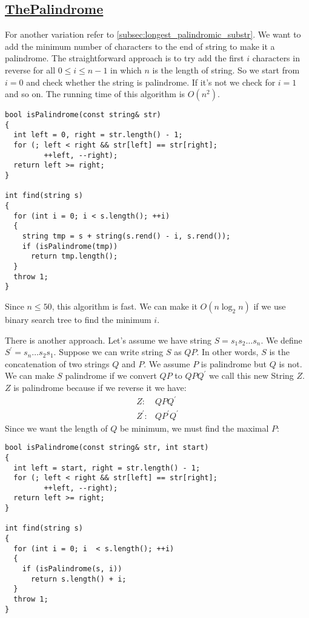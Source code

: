 \documentclass{book}
\begin{document}
	\subsection{\href{https://community.topcoder.com/stat?c=problem_statement&pm=10182&rd=13519}{ThePalindrome}}
	\label{subsec:the_palindrome}
	For another variation refer to \ref{subsec:longest_palindromic_substr}.
	We want to add the minimum number of characters to the end of string to make it a palindrome. The straightforward approach is to try add the first $i$ characters in reverse for all $0 \le i \le n - 1$ in which $n$ is the length of string. So we start from $i = 0$ and check whether the string is palindrome. If it's not we check for $i = 1$ and so on. The running time of this algorithm is $O(n^2)$.
	
	\begin{lstlisting}
bool isPalindrome(const string& str)
{
  int left = 0, right = str.length() - 1;
  for (; left < right && str[left] == str[right]; 
         ++left, --right);
  return left >= right;
}

int find(string s)
{
  for (int i = 0; i < s.length(); ++i)
  {
    string tmp = s + string(s.rend() - i, s.rend());
    if (isPalindrome(tmp))
      return tmp.length();
  }
  throw 1;
}
	\end{lstlisting}
	Since $n \le 50$, this algorithm is fast. We can make it $O(n\log_2{n})$ if we use binary search tree to find the minimum $i$.
	\par There is another approach. Let's assume we have string $S = s_1 s_2 \dots s_n$. We define $S^\prime = s_n \dots s_2 s_1$. Suppose we can write string $S$ as $QP$. In other words, $S$ is the concatenation of two strings $Q$ and $P$. We assume $P$ is palindrome but $Q$ is not. We can make $S$ palindrome if we convert $QP$ to $QPQ^\prime$ we call this new String $Z$. $Z$ is palindrome because if we reverse it we have:
	\begin{equation*}
		\begin{matrix}
			Z: & QPQ^\prime \\
			Z^\prime : & QP^\prime Q^\prime
		\end{matrix}
	\end{equation*}	
	Since we want the length of $Q$	be minimum, we must find the maximal $P$:
	\begin{lstlisting}
bool isPalindrome(const string& str, int start)
{
  int left = start, right = str.length() - 1;
  for (; left < right && str[left] == str[right]; 
         ++left, --right);
  return left >= right;
}

int find(string s)
{
  for (int i = 0; i  < s.length(); ++i)
  {
    if (isPalindrome(s, i))
      return s.length() + i;
  }
  throw 1;
}
	
	\end{lstlisting}
\end{document}
